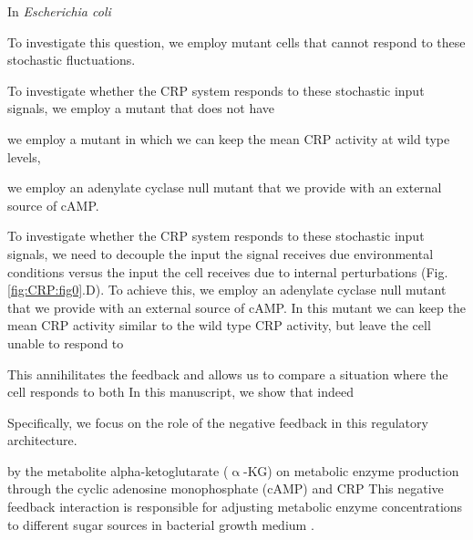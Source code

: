 In \textit{Escherichia coli}





To investigate this question, we employ mutant cells that cannot respond to these stochastic fluctuations.
%



To investigate whether the CRP system responds to these stochastic input signals, 
we employ a mutant that does not have 

we employ a mutant in which we can keep the mean CRP activity at wild type levels,

we employ an adenylate cyclase null mutant that we provide with an external source of cAMP.
%





To investigate whether the CRP system responds to these stochastic input signals, 
%
we need to decouple the input the signal receives due environmental conditions versus the input the cell receives due to internal perturbations (Fig. \ref{fig:CRP:fig0}.D).
%
To achieve this,
we employ an adenylate cyclase null mutant that we provide with an external source of cAMP.
%
In this mutant we can keep the mean CRP activity similar to the wild type CRP activity, 
but leave the cell unable to respond to 


This annihilitates the feedback and allows us to compare a situation where the cell responds to both 
%
In this manuscript, we show that indeed 




Specifically, we focus on the role of the negative feedback in this regulatory architecture.


by the metabolite alpha-ketoglutarate ($\upalpha$-KG) on metabolic enzyme production through the cyclic adenosine monophosphate (cAMP) and CRP 
This negative feedback interaction is responsible for adjusting metabolic enzyme concentrations to different sugar sources in bacterial growth medium \cite{Towbin2017, Doucette2011, You2013}.







